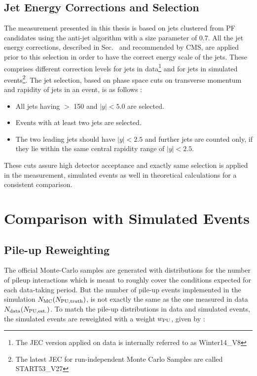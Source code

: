 \subsection{Jet Energy Corrections and Selection}
The measurement presented in this thesis is based on jets clustered from PF candidates using the anti-\kt jet algorithm with a size parameter of 0.7. All the jet energy corrections, described in Sec. \qm~and recommended by CMS, are applied prior to this selection in order to have the correct energy scale of the jets. These comprises different correction levels for jets in data\footnote{The JEC version applied on data is internally referred to as Winter14\_V8} and for jets in simulated events\footnote{The latest JEC for run-independent Monte Carlo Samples are called START53\_V27}. The jet selection, based on phase space cuts on transverse momentum and rapidity of jets in an event, is as follows : 

\begin{itemize}
\item All jets having \pt $>$ 150 \GeV and $|y| < 5.0$ are selected.
\item Events with at least two jets are selected.
\item The two leading jets should have $|y| < 2.5$ and further jets are counted only, if they lie within the same central rapidity range of $|y| < 2.5$. 
\end{itemize}
These cuts assure high detector acceptance and exactly same selection is applied in the measurement, simulated events as well in theoretical calculations for a consistent comparison. 

\section{Comparison with Simulated Events}
\subsection{Pile-up Reweighting}
The official Monte-Carlo samples are generated with distributions for the number of pileup interactions which is meant to roughly cover the conditions expected for each data-taking period. But the number of pile-up events implemented in the simulation $N_{\rm MC} (N_{\rm PU,truth})$, is not exactly the same as the one measured in data $N_{\rm data} (N_{\rm PU,est.})$. To match the pile-up distributions in data and simulated events, the simulated events are reweighted with a weight $w_{\rm PU}$, given by :

